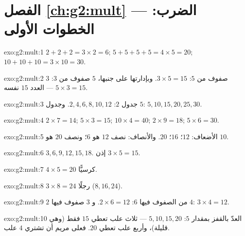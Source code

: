 \section*{الفصل \ref{ch:g2:mult} --- الضرب: الخطوات الأولى}

\begin{solution}{exo:g2:mult:1}
$2 + 2 + 2 = 3 \times 2 = 6$; \quad
$5 + 5 + 5 + 5 = 4 \times 5 = 20$; \quad
$10 + 10 + 10 = 3 \times 10 = 30$.
\end{solution}

\begin{solution}{exo:g2:mult:2}
$3$ صفوف من $5$: $3 \times 5 = 15$. وبإدارتها على جنبها، $5$ صفوف
من $3$: $5 \times 3 = 15$ --- العدد $15$ نفسه.
\end{solution}

\begin{solution}{exo:g2:mult:3}
جدول $2$: $2, 4, 6, 8, 10, 12$. وجدول $5$:
$5, 10, 15, 20, 25, 30$.
\end{solution}

\begin{solution}{exo:g2:mult:4}
$2 \times 7 = 14$; \quad $5 \times 3 = 15$; \quad
$10 \times 4 = 40$; \quad $2 \times 9 = 18$; \quad
$5 \times 6 = 30$.
\end{solution}

\begin{solution}{exo:g2:mult:5}
الأضعاف: $12$؛ $16$؛ $20$. والأنصاف: نصف $12$ هو $6$؛ ونصف
$20$ هو $10$.
\end{solution}

\begin{solution}{exo:g2:mult:6}
$3, 6, 9, 12, 15, 18$. إذن $3 \times 5 = 15$.
\end{solution}

\begin{solution}{exo:g2:mult:7}
$4 \times 5 = 20$ كرسيًّا.
\end{solution}

\begin{solution}{exo:g2:mult:8}
$3 \times 8 = 24$ رجلًا ($8, 16, 24$).
\end{solution}

\begin{solution}{exo:g2:mult:9}
$2$ من الصفوف فيها $6$: $2 \times 6 = 12$. و $3$ صفوف فيها $4$:
$3 \times 4 = 12$.
\end{solution}

\begin{solution}{exo:g2:mult:10}
العدّ بالقفز بمقدار $5$: $5, 10, 15, 20$ --- ثلاث علب تعطي $15$
فقط (وهي قليلة)، وأربع علب تعطي $20$. فعلى مريم أن تشتري $4$ علب.
\end{solution}
